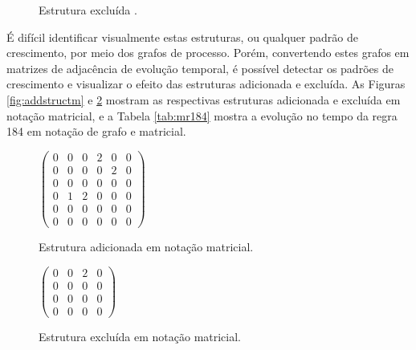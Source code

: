\documentclass[12pt,a4paper]{article}
\begin{document}
\begin{figure}[htp]
\begin{minipage}[b]{0.5\linewidth}
\caption{Estrutura excluída .}
\label{fig:excstruct}
\end{minipage}
\end{figure}

É difícil identificar visualmente estas estruturas, ou qualquer padrão de
crescimento, por meio dos grafos de processo. Porém, convertendo estes grafos
em matrizes de adjacência de evolução temporal, é possível detectar os padrões
de crescimento e visualizar o efeito das estruturas adicionada e
excluída. As Figuras \ref{fig:addstructm} e \ref{fig:excstructm} mostram
as respectivas estruturas adicionada e excluída em notação matricial, e
a Tabela \ref{tab:mr184} mostra a evolução no tempo da regra 184 em notação
de grafo e matricial.

\begin{figure}[htp]
\begin{minipage}[b]{0.5\linewidth}
\begin{center}
\begin{math}
\begin{pmatrix}
0 & 0 & 0 & 2 & 0 & 0 \\
0 & 0 & 0 & 0 & 2 & 0 \\
0 & 0 & 0 & 0 & 0 & 0 \\
0 & 1 & 2 & 0 & 0 & 0 \\
0 & 0 & 0 & 0 & 0 & 0 \\
0 & 0 & 0 & 0 & 0 & 0
\end{pmatrix}
\end{math}
\caption{Estrutura adicionada em notação matricial.}
\label{fig:addstructm}
\end{center}
\end{minipage}
\hspace{0.5cm}
\begin{minipage}[b]{0.5\linewidth}
\begin{center}
\begin{math}
\begin{pmatrix}
0 & 0 & 2 & 0 \\
0 & 0 & 0 & 0 \\
0 & 0 & 0 & 0 \\
0 & 0 & 0 & 0
\end{pmatrix}
\end{math}
\caption{Estrutura excluída em notação matricial.}
\label{fig:excstructm}
\end{center}
\end{minipage}
\end{figure}
\end{document}
